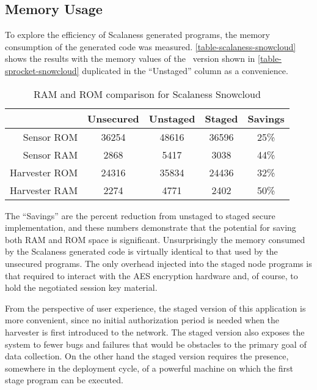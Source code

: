 \subsection{Memory Usage}

To explore the efficiency of Scalaness generated programs, the memory consumption of the
generated code was measured. \autoref{table-scalaness-snowcloud} shows the results with the
memory values of the \Sprocket\ version shown in \autoref{table-sprocket-snowcloud} duplicated
in the ``Unstaged'' column as a convenience.

\begin{table}[h]
\centering \newcommand\T{\rule{0pt}{2.1ex}}
\caption{RAM and ROM comparison for Scalaness Snowcloud} {
\begin{tabular}{|r||c|c|c|c|} \hline \hline
              & Unsecured & Unstaged & Staged & Savings\\ \hline
Sensor ROM    &     36254 &    48616 &  36596 & 25\% \\
Sensor RAM    &      2868 &     5417 &   3038 & 44\% \\ \hline
Harvester ROM &     24316 &    35834 &  24436 & 32\% \\
Harvester RAM &      2274 &     4771 &   2402 & 50\% \\ \hline
\end{tabular}
}
\label{table-scalaness-snowcloud}
\end{table}

The ``Savings'' are the percent reduction from unstaged to staged secure implementation, and
these numbers demonstrate that the potential for saving both RAM and ROM space is significant.
Unsurprisingly the memory consumed by the Scalaness generated code is virtually identical to
that used by the unsecured programs. The only overhead injected into the staged node programs is
that required to interact with the AES encryption hardware and, of course, to hold the
negotiated session key material.

From the perspective of user experience, the staged version of this application is more
convenient, since no initial authorization period is needed when the harvester is first
introduced to the network. The staged version also exposes the system to fewer bugs and failures
that would be obstacles to the primary goal of data collection. On the other hand the staged
version requires the presence, somewhere in the deployment cycle, of a powerful machine on which
the first stage program can be executed.


